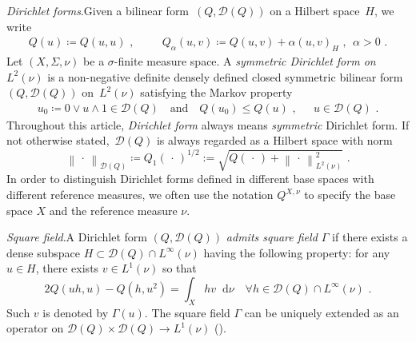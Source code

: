 \documentclass[11pt,letterpaper]{amsart}
\newcommand{\emparg}{{\,\cdot\,}}
\newcommand{\dom}[1]{\mathcal D(#1)}
\newcommand{\comm}{\,\,\mathrm{,}\;\,}
\DeclareMathOperator{\eqdef}{\coloneqq}
\newcommand{\diff}{\mathop{}\!\mathrm{d}}
\newcommand{\norm}[1]{\left\lVert#1\right\rVert}					%
\newcommand{\fstop}{\,\,\mathrm{.}}
\newcommand{\cdc}{\Gamma}
\renewcommand{\1}{\mathbf 1}
\numberwithin{equation}{section}
\theoremstyle{plain}
\theoremstyle{definition}
\theoremstyle{remark}
\renewcommand{\paragraph}[1]{\medskip\emph{#1}.\quad}
\begin{document}
\paragraph{Dirichlet forms}Given a bilinear form~$(Q,\dom{Q})$ on a Hilbert space~$H$, we write
\begin{align*}
Q(u)\eqdef Q(u,u) \comm \qquad Q_\alpha(u,v)\eqdef Q(u,v)+\alpha(u, v)_H\comm \alpha>0\fstop
\end{align*}
Let $(X, \Sigma, \nu)$ be a $\sigma$-finite measure space. A \emph{symmetric Dirichlet form on~$L^2(\nu)$} is a non-negative definite densely defined closed symmetric bilinear form~$(Q,\dom{Q})$ on~$L^2(\nu)$ satisfying the Markov property
\begin{align*}
u_0\eqdef 0\vee u \wedge 1\in \dom{Q} \quad \text{and} \quad Q(u_0)\leq Q(u)\comm \quad u\in\dom{Q}\fstop
\end{align*}
Throughout this article, {\it Dirichlet form} always means {\it symmetric} Dirichlet form.
If not otherwise stated,~$\dom{Q}$ is always regarded as a Hilbert space with norm
$$\norm{\emparg}_{\dom{Q}}\eqdef Q_1(\emparg)^{1/2}:=\sqrt{Q(\emparg)+\norm{\emparg}_{L^2(\nu)}^2}\fstop $$
In order to distinguish Dirichlet forms defined in different base spaces with different reference measures, we often use the notation $Q^{X, \nu}$ to specify the base space $X$ and the reference measure $\nu$. 

\paragraph{Square field}A Dirichlet form $(Q, \dom{Q})$ {\it admits square field $\cdc$} if there exists a dense subspace $H \subset \dom{Q} \cap L^\infty(\nu)$ having the following property: for any $u \in H$, there exists $v \in L^1(\nu)$ so that 
$$2Q(uh, u) -Q(h, u^2) = \int_X h v \diff \nu \quad \forall h \in \dom{Q} \cap L^\infty(\nu) \fstop$$
Such $v$ is denoted by $\Gamma(u)$. The square field $\Gamma$ can be uniquely extended as an operator on $\dom{Q} \times \dom{Q} \to L^1(\nu)$ (\cite[Thm.\ I.4.1.3]{BouHir91}).
\end{document}
